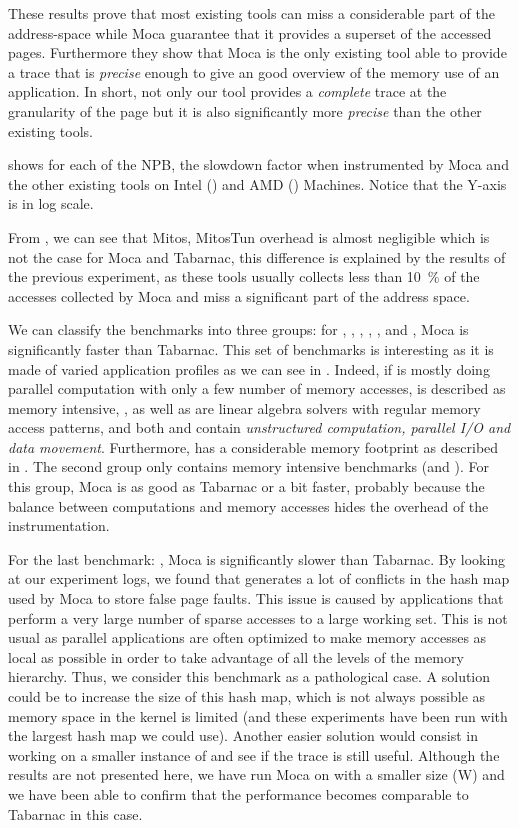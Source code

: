 These results prove that most existing tools can miss a considerable part of
the address-space while \gls{Moca} guarantee that it provides a superset of the accessed pages.
Furthermore they show that \gls{Moca} is the only existing tool able to provide a trace that is \emph{precise} enough to give an good overview of the memory use of an application.
In short, not only our tool provides a \emph{complete} trace at the granularity of the page but it is also significantly more \emph{precise} than the other existing tools.

 shows for each of the \gls{NPB}, the slowdown factor when instrumented by \gls{Moca} and the other existing tools on Intel () and AMD () Machines.
Notice that the Y-axis is in log scale.

From , we can see that \gls{Mitos}, MitosTun overhead is almost negligible which is not the case for \gls{Moca} and \gls{Tabarnac}, this difference is explained by the results of the previous experiment, as these tools usually collects less than \SI{10}{\%} of the accesses collected by \gls{Moca} and miss a significant part of the address space.

We can classify the benchmarks into three groups: for \BT, \CG, \DC,  \EP, \LU, \SP and \UA, \gls{Moca} is significantly faster than \gls{Tabarnac}.
This set of benchmarks is interesting as it is made of varied application profiles as we can see in .
Indeed, if \EP is mostly doing parallel computation with only a few number of memory accesses, \CG is described as memory intensive, \BT, \LU as well as \SP are linear algebra solvers with regular memory access patterns, and both \UA and \DC contain \emph{unstructured computation, parallel I/O and data movement}.
Furthermore, \DC has a considerable memory footprint as described in .
The second group only contains memory intensive benchmarks (\FT and
\IS). For this group, \gls{Moca} is as good as \gls{Tabarnac} or a bit faster, probably
because the balance between computations and memory accesses hides the
overhead of the instrumentation.

For the last benchmark: \MG, \gls{Moca} is significantly slower than \gls{Tabarnac}.
By looking at our experiment logs, we found that \MG generates a lot of conflicts in the hash map used by \gls{Moca} to store false page faults.
This issue is caused by applications that perform a very large number of sparse accesses to a large working set.
This is not usual as parallel applications are often optimized to make memory accesses as local as possible in order to take advantage of all the levels of the memory hierarchy.
Thus, we consider this benchmark as a pathological case.
A solution could be to increase the size of this hash map, which is not always possible as memory space in the kernel is limited (and these experiments have been run with the largest hash map we could use).
Another easier solution would consist in working on a smaller instance of \MG and see if the trace is still useful.
Although the results are not presented here, we have run \gls{Moca} on \MG with a smaller size (W) and we have been able to confirm that the performance becomes comparable to \gls{Tabarnac} in this case.

